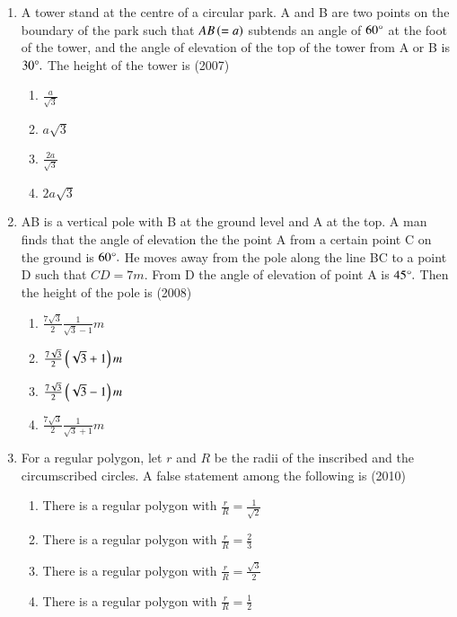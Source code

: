 \documentclass[journal,12pt,twocolumn]{IEEEtran}
\theoremstyle{remark}
\begin{document}
\begin{enumerate}[start =3]
\item A tower stand at the centre of a circular park. A and B are two points on the boundary of the park such that $AB\left(=a\right)$ subtends an angle of $60\degree$ at the foot of the tower, and the angle of elevation of the top of the tower from A or B is $30\degree.$ The height of the tower is \hfill{(2007)}
\begin{multicols}{4}
\begin{enumerate}
        \item $\frac{a}{\sqrt{3}}$                    
        \item $a\sqrt{3}$ 
        \item $\frac{2a}{\sqrt{3}}$ 
        \item $2a\sqrt{3}$
\end{enumerate}
\end{multicols} 

\item AB is a vertical pole with B at the ground level and A at the top. A man finds that the angle of elevation the the point A from a certain point C on the ground is $60\degree.$ He moves away from the pole along the line BC to a point D such that $CD=7m.$ From D the angle of elevation of point A is $45\degree.$ Then the height of the pole is  \hfill{(2008)}
\begin{multicols}{2}
\begin{enumerate}
        \item $\frac{7\sqrt{3}}{2}\frac{1}{\sqrt{3}-1}m$                   
        \item $\frac{7\sqrt{3}}{2}\left(\sqrt{3}+1\right)m$ 
        \item $\frac{7\sqrt{3}}{2}\left(\sqrt{3}-1\right)m$ 
        \item $\frac{7\sqrt{3}}{2}\frac{1}{\sqrt{3}+1}m$
\end{enumerate}
\end{multicols} 

\item For a regular polygon, let $r$ and $R$ be the radii of the inscribed and the circumscribed circles. A false statement among the following is \hfill{(2010)}
\begin{enumerate}
        \item There is a regular polygon with $\frac{r}{R}=\frac{1}{\sqrt{2}}$                    
        \item There is a regular polygon with $\frac{r}{R}=\frac{2}{3}$ 
        \item There is a regular polygon with $\frac{r}{R}=\frac{\sqrt{3}}{2}$ 
        \item There is a regular polygon with $\frac{r}{R}=\frac{1}{2}$
\end{enumerate} 


\end{enumerate}
\end{document}
